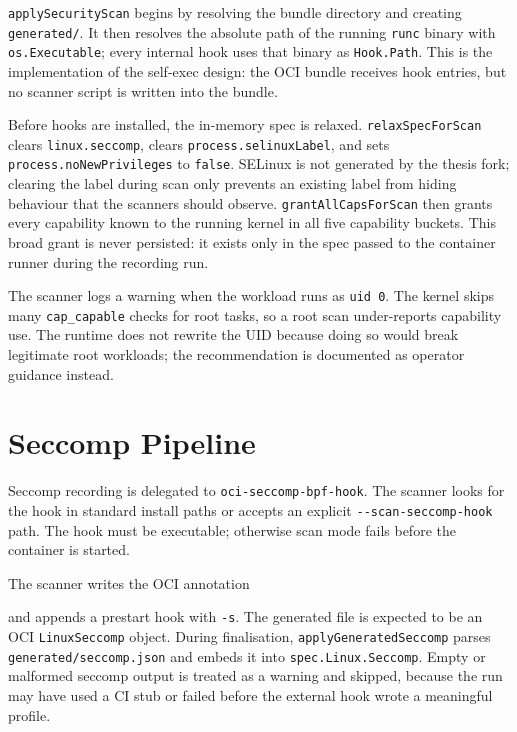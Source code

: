 \texttt{applySecurityScan} begins by resolving the bundle directory and creating \texttt{generated/}. It then resolves the absolute path of the running \texttt{runc} binary with \texttt{os.Executable}; every internal hook uses that binary as \texttt{Hook.Path}. This is the implementation of the self-exec design: the OCI bundle receives hook entries, but no scanner script is written into the bundle.

Before hooks are installed, the in-memory spec is relaxed. \texttt{relaxSpecForScan} clears \texttt{linux.seccomp}, clears \texttt{process.selinuxLabel}, and sets \texttt{process.noNewPrivileges} to \texttt{false}. SELinux is not generated by the thesis fork; clearing the label during scan only prevents an existing label from hiding behaviour that the scanners should observe. \texttt{grantAllCapsForScan} then grants every capability known to the running kernel in all five capability buckets. This broad grant is never persisted: it exists only in the spec passed to the container runner during the recording run.

The scanner logs a warning when the workload runs as \texttt{uid 0}. The kernel skips many \texttt{cap\_capable} checks for root tasks, so a root scan under-reports capability use. The runtime does not rewrite the UID because doing so would break legitimate root workloads; the recommendation is documented as operator guidance instead.

\section{Seccomp Pipeline}\label{sec:impl-seccomp}

Seccomp recording is delegated to \texttt{oci-seccomp-bpf-hook}. The scanner looks for the hook in standard install paths or accepts an explicit \texttt{-{}-scan-seccomp-hook} path. The hook must be executable; otherwise scan mode fails before the container is started.

The scanner writes the OCI annotation
\begin{quote}
\small{}
\end{quote}
and appends a prestart hook with \texttt{-s}. The generated file is expected to be an OCI \texttt{LinuxSeccomp} object. During finalisation, \texttt{applyGeneratedSeccomp} parses \texttt{generated/seccomp.json} and embeds it into \texttt{spec.Linux.Seccomp}. Empty or malformed seccomp output is treated as a warning and skipped, because the run may have used a CI stub or failed before the external hook wrote a meaningful profile.

